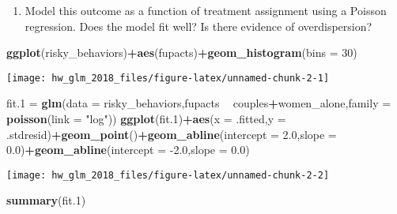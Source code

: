 \documentclass[]{article}
\newenvironment{Shaded}{\begin{snugshade}}{\end{snugshade}}
\newcommand{\DataTypeTok}[1]{\textcolor[rgb]{0.13,0.29,0.53}{#1}}
\newcommand{\DecValTok}[1]{\textcolor[rgb]{0.00,0.00,0.81}{#1}}
\newcommand{\FloatTok}[1]{\textcolor[rgb]{0.00,0.00,0.81}{#1}}
\newcommand{\KeywordTok}[1]{\textcolor[rgb]{0.13,0.29,0.53}{\textbf{#1}}}
\newcommand{\NormalTok}[1]{#1}
\newcommand{\OperatorTok}[1]{\textcolor[rgb]{0.81,0.36,0.00}{\textbf{#1}}}
\newcommand{\StringTok}[1]{\textcolor[rgb]{0.31,0.60,0.02}{#1}}
\providecommand{\tightlist}{%
  \setlength{\itemsep}{0pt}\setlength{\parskip}{0pt}}
\begin{document}
\begin{enumerate}
\def\labelenumi{\arabic{enumi}.}
\tightlist
\item
  Model this outcome as a function of treatment assignment using a
  Poisson regression. Does the model fit well? Is there evidence of
  overdispersion?
\end{enumerate}

\begin{Shaded}
\begin{Highlighting}[]
\KeywordTok{ggplot}\NormalTok{(risky_behaviors)}\OperatorTok{+}\KeywordTok{aes}\NormalTok{(fupacts)}\OperatorTok{+}\KeywordTok{geom_histogram}\NormalTok{(}\DataTypeTok{bins =} \DecValTok{30}\NormalTok{)}
\end{Highlighting}
\end{Shaded}

\begin{center}\texttt{[image: hw\_glm\_2018\_files/figure-latex/unnamed-chunk-2-1]} \end{center}

\begin{Shaded}
\begin{Highlighting}[]
\NormalTok{fit}\FloatTok{.1}\NormalTok{ =}\StringTok{ }\KeywordTok{glm}\NormalTok{(}\DataTypeTok{data =}\NormalTok{ risky_behaviors,fupacts }\OperatorTok{~}\StringTok{ }\NormalTok{couples}\OperatorTok{+}\NormalTok{women_alone,}\DataTypeTok{family =} \KeywordTok{poisson}\NormalTok{(}\DataTypeTok{link =} \StringTok{"log"}\NormalTok{))}
\KeywordTok{ggplot}\NormalTok{(fit}\FloatTok{.1}\NormalTok{)}\OperatorTok{+}\KeywordTok{aes}\NormalTok{(}\DataTypeTok{x =}\NormalTok{ .fitted,}\DataTypeTok{y =}\NormalTok{ .stdresid)}\OperatorTok{+}\KeywordTok{geom_point}\NormalTok{()}\OperatorTok{+}\KeywordTok{geom_abline}\NormalTok{(}\DataTypeTok{intercept =} \FloatTok{2.0}\NormalTok{,}\DataTypeTok{slope =} \FloatTok{0.0}\NormalTok{)}\OperatorTok{+}\KeywordTok{geom_abline}\NormalTok{(}\DataTypeTok{intercept =} \FloatTok{-2.0}\NormalTok{,}\DataTypeTok{slope =} \FloatTok{0.0}\NormalTok{)}
\end{Highlighting}
\end{Shaded}

\begin{center}\texttt{[image: hw\_glm\_2018\_files/figure-latex/unnamed-chunk-2-2]} \end{center}

\begin{Shaded}
\begin{Highlighting}[]
\KeywordTok{summary}\NormalTok{(fit}\FloatTok{.1}\NormalTok{)}
\end{Highlighting}
\end{Shaded}
\end{document}
